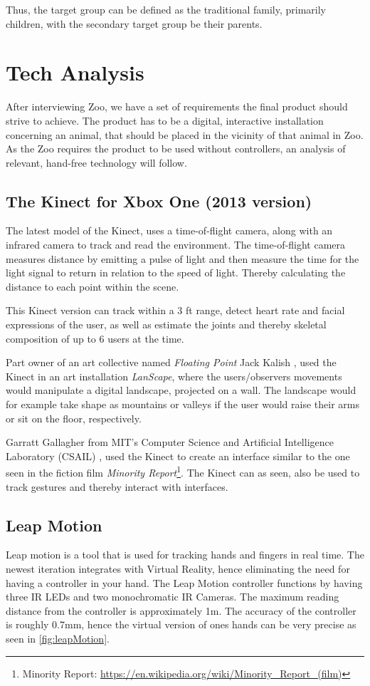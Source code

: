 Thus, the target group can be defined as the traditional family, primarily children, with the secondary target group be their parents.

\section{Tech Analysis}\label{Tech}
After interviewing Zoo, we have a set of requirements the final product should strive to achieve. The product has to be a digital, interactive installation concerning an animal, that should be placed in the vicinity of that animal in Zoo. As the Zoo requires the product to be used without controllers, an analysis of relevant, hand-free technology will follow.

 \subsection{The Kinect for Xbox One (2013 version)}
        The latest model of the Kinect, uses a time-of-flight camera, along with an infrared camera to track and read the environment\cite{KinectWiki}. The time-of-flight camera measures distance by emitting a pulse of light and then measure the time for the light signal to return in relation to the speed of light. Thereby calculating the distance to each point within the scene.
        
        This Kinect version can track within a 3 ft range, detect heart rate and facial expressions of the user, as well as estimate the joints and thereby skeletal composition of up to 6 users at the time\cite{KinectWiki}.
        
        Part owner of an art collective named \textit{Floating Point} Jack Kalish \cite{LANscapes}, used the Kinect in an art installation \textit{LanScape}, where the users/observers movements would manipulate a digital landscape, projected on a wall. The landscape would for example take shape as mountains or valleys if the user would raise their arms or sit on the floor, respectively.
        
        Garratt Gallagher from MIT’s Computer Science and Artificial Intelligence Laboratory (CSAIL) \cite{MR_MIT}, used the Kinect to create an interface similar to the one seen in the fiction film \textit{Minority Report}\footnote{Minority Report: \url{https://en.wikipedia.org/wiki/Minority_Report_(film)}}. The Kinect can as seen, also be used to track gestures and thereby interact with interfaces. 
        
        \subsection{Leap Motion} %
    Leap motion is a tool that is used for tracking hands and fingers in real time\cite{leapMotion}. The newest iteration integrates with Virtual Reality, hence eliminating the need for having a controller in your hand. The Leap Motion controller functions by having three IR LEDs and two monochromatic IR Cameras. The maximum reading distance from the controller is approximately 1m\cite{leapMotion}. The accuracy of the controller is roughly 0.7mm, hence the virtual version of ones hands can be very precise as seen in \autoref{fig:leapMotion}.
    
